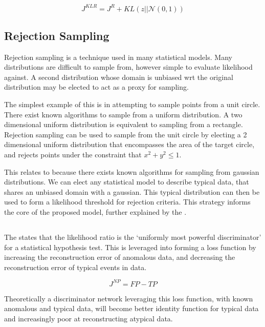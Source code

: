 \documentclass{article}
\begin{document}
\begin{multicols}{2}
\[J^{KLR}=J^R + KL(z||\mathcal{N}(0, 1))\]

\resizebox{.8\columnwidth}{!}{}


\subsection{Rejection Sampling}

Rejection sampling is a technique used in many statistical models. Many distributions
are difficult to sample from, however simple to evaluate likelihood against. A second
distribution whose domain is unbiased wrt the original distribution may be elected to
act as a proxy for sampling.

The simplest example of this is in attempting to sample points from a unit circle. There
exist known algorithms to sample from a uniform distribution. A two dimensional uniform
distribution is equivalent to sampling from a rectangle. Rejection sampling can be used
to sample from the unit circle by electing a 2 dimensional uniform distribution that
encompasses the area of the target circle, and rejects points under the constraint that
$x^2 + y^2 \le 1$.

This relates to \vae because there exists known algorithms for sampling from gaussian
distributions. We can elect any statistical model to describe typical data, that
shares an unbiased domain with a gaussian. This typical distribution can then be used
to form a likelihood threshold for rejection criteria. This strategy informs the core
of the proposed model, further explained by the \np.

\subsection{\np}

The \np states that the likelihood ratio is the `uniformly most powerful discriminator'
for a statistical hypothesis test. This is leveraged into forming a loss function by
increasing the reconstruction error of anomalous data, and decreasing the reconstruction
error of typical events in data.

\[J^{NP} = FP - TP\]

Theoretically a discriminator network leveraging this loss function, with known anomalous
and typical data, will become better identity function for typical data and increasingly
poor at reconstructing atypical data.

\section{}


\end{multicols}
\end{document}
